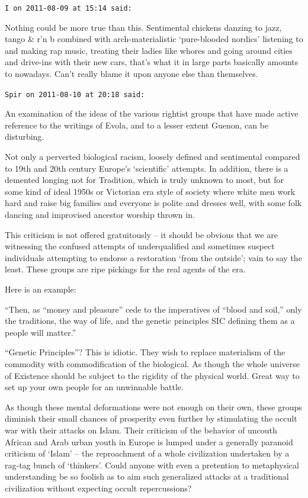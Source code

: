 \begin{footnotesize}
\begin{sffamily}
\texttt{I on 2011-08-09 at 15:14 said:}

Nothing could be more true than this. Sentimental chickens danzing to jazz, tango \& r'n b combined with arch-materialistic `pure-blooded nordics' listening to and making rap music, treating their ladies like whores and going around cities and drive-ins with their new cars, that's what it in large parts basically amounts to nowadays. Can't really blame it upon anyone else than themselves.

\hfill

\texttt{Spir on 2011-08-10 at 20:18 said:}

An examination of the ideas of the various rightist groups that have made active reference to the writings of Evola, and to a lesser extent Guenon, can be disturbing.

Not only a perverted biological racism, loosely defined and sentimental compared to 19th and 20th century Europe's `scientific' attempts. In addition, there is a demented longing not for Tradition, which is truly unknown to most, but for some kind of ideal 1950s or Victorian era style of society where white men work hard and raise big families and everyone is polite and dresses well, with some folk dancing and improvised ancestor worship thrown in.

This criticism is not offered gratuitously -- it should be obvious that we are witnessing the confused attempts of underqualified and sometimes suspect individuals attempting to endorse a restoration `from the outside'; vain to say the least. These groups are ripe pickings for the real agents of the era.

Here is an example:

``Then, as ``money and pleasure'' cede to the imperatives of ``blood and soil,'' only the traditions, the way of life, and the genetic principles SIC defining them as a people will matter.''

``Genetic Principles''? This is idiotic. They wish to replace materialism of the commodity with commodification of the biological. As though the whole universe of Existence should be subject to the rigidity of the physical world. Great way to set up your own people for an unwinnable battle.

As though these mental deformations were not enough on their own, these groups diminish their small chances of prosperity even further by stimulating the occult war with their attacks on Islam. Their criticism of the behavior of uncouth African and Arab urban youth in Europe is lumped under a generally paranoid criticism of `Islam' -- the reproachment of a whole civilization undertaken by a rag-tag bunch of `thinkers'. Could anyone with even a pretention to metaphysical understanding be so foolish as to aim such generalized attacks at a traditional civilization without expecting occult repercussions?


\end{sffamily}
\end{footnotesize}
